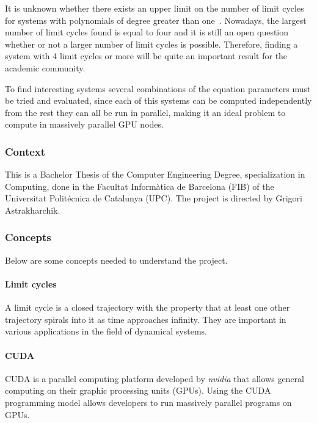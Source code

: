 \pagebreak
It is unknown whether there exists an upper limit on the number of limit cycles
for systems with polynomials of degree greater than
one~\cite{christopher_hilberts_2007,ilyashenko_centennial_2002,llibre_sobre_2015}.
Nowadays, the largest number of limit cycles found is equal to four and it is
still an open question whether or not a larger number of limit cycles is
possible. Therefore, finding a system with 4 limit cycles or more will be quite
an important result for the academic community.

To find interesting systems several combinations of the equation parameters
must be tried and evaluated, since each of this systems can be computed
independently from the rest they can all be run in parallel, making it an ideal
problem to compute in massively parallel GPU nodes.

\subsubsection{Context}

This is a Bachelor Thesis of the Computer Engineering Degree, specialization in
Computing, done in the \textcatalan{Facultat Inform\`atica de Barcelona (FIB)}
of the \textcatalan{Universitat Polit\'ecnica de Catalunya (UPC)}. The project
is directed by Grigori Astrakharchik.

\subsubsection{Concepts}

Below are some concepts needed to understand the project.

\paragraph{Limit cycles}

A limit cycle is a closed trajectory with the property that at least one other
trajectory spirals into it as time approaches infinity. They are important in
various applications in the field of dynamical systems.

\paragraph{CUDA}
CUDA is a parallel computing platform developed by \emph{nvidia} that allows general
computing on their graphic processing units (GPUs). Using the CUDA programming
model allows developers to run massively parallel programs on GPUs.


